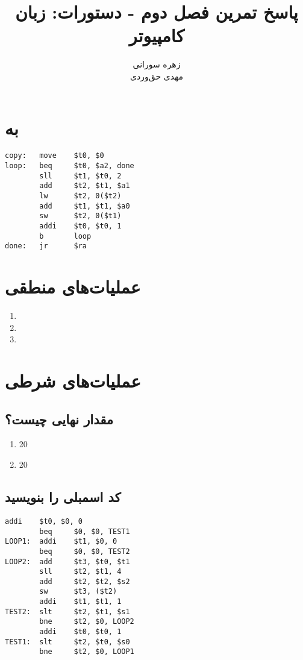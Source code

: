 \documentclass[11pt, dvipsnames, svgnames, x11names]{article}
\title{پاسخ تمرین فصل دوم - دستورات: زبان کامپیوتر}
\author{
    زهره سورانی \\
    مهدی‌ حق‌وردی}
\date{}
\begin{document}
\maketitle
\tableofcontents
\newpage
\section{ به }
\begin{latin}
\begin{lstlisting}[keywords={move, beq, sll, add, lw, sw, addi, b, jr}]
copy:   move    $t0, $0
loop:   beq     $t0, $a2, done
        sll     $t1, $t0, 2
        add     $t2, $t1, $a1
        lw      $t2, 0($t2)
        add     $t1, $t1, $a0
        sw      $t2, 0($t1)
        addi    $t0, $t0, 1
        b       loop
done:   jr      $ra
\end{lstlisting}
\end{latin}

\section{عملیات‌های منطقی}
\begin{enumerate}
\item 
{}
\item 
{}
\item 
{}
\end{enumerate}

\section{عملیات‌های شرطی }
\subsection{مقدار نهایی چیست؟}
\begin{enumerate}
    \item 20
    \item 20
\end{enumerate}

\newpage
\subsection{کد اسمبلی را بنویسید}
\begin{latin}
\begin{lstlisting}[keywords={addi, beq, add, sll, sw, slt, bne, }]
        addi    $t0, $0, 0
        beq     $0, $0, TEST1
LOOP1:  addi    $t1, $0, 0
        beq     $0, $0, TEST2
LOOP2:  add     $t3, $t0, $t1
        sll     $t2, $t1, 4
        add     $t2, $t2, $s2
        sw      $t3, ($t2)
        addi    $t1, $t1, 1
TEST2:  slt     $t2, $t1, $s1
        bne     $t2, $0, LOOP2
        addi    $t0, $t0, 1
TEST1:  slt     $t2, $t0, $s0
        bne     $t2, $0, LOOP1
\end{lstlisting}
\end{latin}
\end{document}
